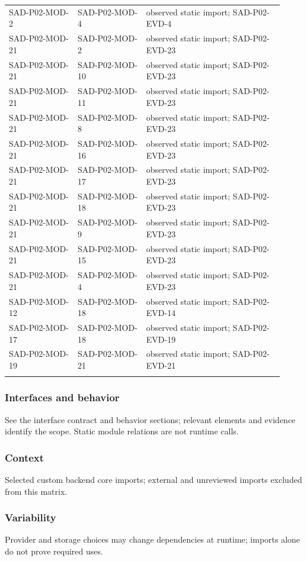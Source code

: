 \documentclass[10pt,letterpaper]{article}
\begin{document}
\begin{longtable}{@{}>{\raggedright\arraybackslash}p{0.23\linewidth}>{\raggedright\arraybackslash}p{0.23\linewidth}>{\raggedright\arraybackslash}p{0.46\linewidth}@{}}
SAD-P02-MOD-2 & SAD-P02-MOD-4 & observed static import; SAD-P02-EVD-4\\\addlinespace
SAD-P02-MOD-21 & SAD-P02-MOD-2 & observed static import; SAD-P02-EVD-23\\\addlinespace
SAD-P02-MOD-21 & SAD-P02-MOD-10 & observed static import; SAD-P02-EVD-23\\\addlinespace
SAD-P02-MOD-21 & SAD-P02-MOD-11 & observed static import; SAD-P02-EVD-23\\\addlinespace
SAD-P02-MOD-21 & SAD-P02-MOD-8 & observed static import; SAD-P02-EVD-23\\\addlinespace
SAD-P02-MOD-21 & SAD-P02-MOD-16 & observed static import; SAD-P02-EVD-23\\\addlinespace
SAD-P02-MOD-21 & SAD-P02-MOD-17 & observed static import; SAD-P02-EVD-23\\\addlinespace
SAD-P02-MOD-21 & SAD-P02-MOD-18 & observed static import; SAD-P02-EVD-23\\\addlinespace
SAD-P02-MOD-21 & SAD-P02-MOD-9 & observed static import; SAD-P02-EVD-23\\\addlinespace
SAD-P02-MOD-21 & SAD-P02-MOD-15 & observed static import; SAD-P02-EVD-23\\\addlinespace
SAD-P02-MOD-21 & SAD-P02-MOD-4 & observed static import; SAD-P02-EVD-23\\\addlinespace
SAD-P02-MOD-12 & SAD-P02-MOD-18 & observed static import; SAD-P02-EVD-14\\\addlinespace
SAD-P02-MOD-17 & SAD-P02-MOD-18 & observed static import; SAD-P02-EVD-19\\\addlinespace
SAD-P02-MOD-19 & SAD-P02-MOD-21 & observed static import; SAD-P02-EVD-21\\\addlinespace
\bottomrule\end{longtable}

\subsubsection{Interfaces and behavior}
See the interface contract and behavior sections; relevant elements and evidence identify the scope. Static module relations are not runtime calls.
\subsubsection{Context}
Selected custom backend core imports; external and unreviewed imports excluded from this matrix.
\subsubsection{Variability}
Provider and storage choices may change dependencies at runtime; imports alone do not prove required uses.
\end{document}
